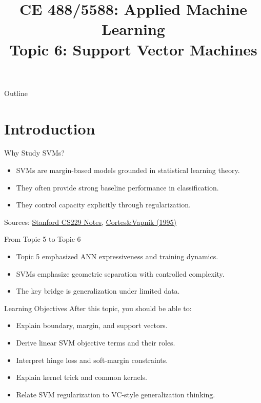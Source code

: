 \documentclass[10pt]{beamer}
\title[Topic 6]{CE 488/5588: Applied Machine Learning\\\large Topic 6: Support Vector Machines}
\author{}
\date{}
\begin{document}
\begin{frame}[plain]
  \titlepage
\end{frame}

\begin{frame}{Outline}
  \justifying
  \tableofcontents
\end{frame}

\section{Introduction}

\begin{frame}{Why Study SVMs?}
  \justifying
  \begin{itemize}
    \item SVMs are margin-based models grounded in statistical learning theory.
    \item They often provide strong baseline performance in classification.
    \item They control capacity explicitly through regularization.
  \end{itemize}
  \vspace{0.4em}
  \footnotesize
  Sources: \href{https://see.stanford.edu/materials/aimlcs229/cs229-notes3.pdf}{Stanford CS229 Notes},
  \href{https://link.springer.com/article/10.1023/A:1022627411411}{Cortes\&Vapnik (1995)}
\end{frame}

\begin{frame}{From Topic 5 to Topic 6}
  \justifying
  \begin{itemize}
    \item Topic 5 emphasized ANN expressiveness and training dynamics.
    \item SVMs emphasize geometric separation with controlled complexity.
    \item The key bridge is generalization under limited data.
  \end{itemize}
\end{frame}

\begin{frame}{Learning Objectives}
  \justifying
  After this topic, you should be able to:
  \begin{itemize}
    \item Explain boundary, margin, and support vectors.
    \item Derive linear SVM objective terms and their roles.
    \item Interpret hinge loss and soft-margin constraints.
    \item Explain kernel trick and common kernels.
    \item Relate SVM regularization to VC-style generalization thinking.
  \end{itemize}
\end{frame}
\end{document}
